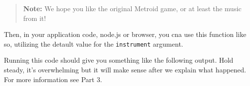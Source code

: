 \begin{quote}
\textbf{Note:} We hope you like the original Metroid game, or at least
the music from it!
\end{quote}

\begin{Shaded}
\begin{Highlighting}[]
\OperatorTok{,}\OperatorTok{=} \NormalTok{) }\OperatorTok{\{}
  \OperatorTok{=}\NormalTok{(}\OperatorTok{\{}\OperatorTok{,}\OperatorTok{\}}\NormalTok{)}
\OperatorTok{\}}
\end{Highlighting}
\end{Shaded}

Then, in your application code, node.js or browser, you cna use this
function like so, utilizing the detault value for the
\texttt{instrument} argument.

\begin{Shaded}
\begin{Highlighting}[]
\OperatorTok{=} \NormalTok{(}\NormalTok{)}
\OperatorTok{=}
\NormalTok{(}\NormalTok{)}
\end{Highlighting}
\end{Shaded}

Running this code should give you something like the following output.
Hold steady, it's overwhelming but it will make sense after we explain
what happened. For more information see Part 3.

\begin{Shaded}
\begin{Highlighting}[]
\FunctionTok{\{}
  \FunctionTok{:}\FunctionTok{,}
  \FunctionTok{:}\FunctionTok{,}
  \FunctionTok{:} \FunctionTok{\{}
    \FunctionTok{:}\FunctionTok{,}
    \FunctionTok{:}
  \FunctionTok{\}}
\FunctionTok{\}}
\end{Highlighting}
\end{Shaded}

